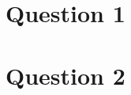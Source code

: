 \documentclass[a4paper,12pt]{texDoc}
\begin{document}
\maketitle %

\section*{Question 1}

\section*{Question 2}

\end{document}
